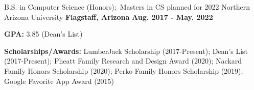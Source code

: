 

\begin{cventries}

  \cventry
    {B.S. in Computer Science (Honors); \,Masters in CS planned for 2022} %
    {Northern Arizona University} %
    {\textbf{Flagstaff, Arizona}} %
    {\textbf{Aug. 2017 - May. 2022}} %
    {
      \begin{cvitems} %
        \item {\textbf{GPA:} 3.85 (Dean's List)}
        \item {\textbf{Scholarships/Awards:} LumberJack Scholarship (2017-Present); Dean’s List (2017-Present); Pheatt Family Research and Design Award (2020);
        Nackard Family Honors Scholarship (2020); Perko Family Honors Scholarship (2019); Google Favorite App Award (2015)}
      \end{cvitems}
    }

\end{cventries}
